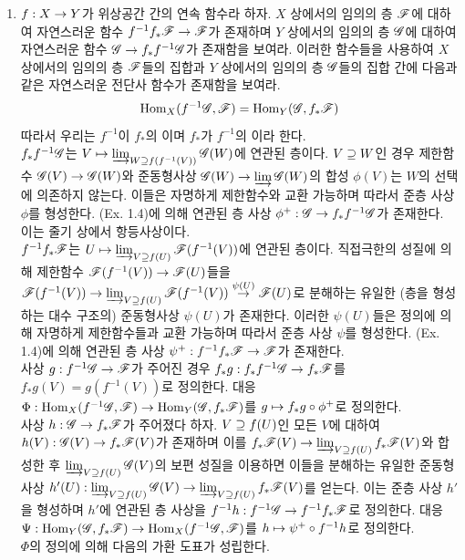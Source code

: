 \begin{enumerate}[label=\tb{1.\arabic*.},itemindent=0mm,itemsep=4mm]
	\item {} $f:X\rightarrow Y$가 위상공간 간의 연속 함수라 하자.
	$X$ 상에서의 임의의 층 $\mathscr{F}$에 대하여 자연스러운 함수 $f^{-1}f_*\mathscr{F}\rightarrow\mathscr{F}$가 존재하며
	$Y$ 상에서의 임의의 층 $\mathscr{G}$에 대하여 자연스러운 함수 $\mathscr{G}\rightarrow f_*f^{-1}\mathscr{G}$가 존재함을 보여라.
	이러한 함수들을 사용하여 $X$ 상에서의 임의의 층 $\mathscr{F}$들의 집합과 $Y$ 상에서의 임의의 층 $\mathscr{G}$들의 집합 간에
	다음과 같은 자연스러운 전단사 함수가 존재함을 보여라.
	$$\operatorname{Hom}_X(f^{-1}\mathscr{G},\mathscr{F})=\operatorname{Hom}_Y(\mathscr{G},f_*\mathscr{F})$$
	따라서 우리는 $f^{-1}$이 $f_*$의 이며 $f_*$가 $f^{-1}$의 이라 한다.\\
	\sol $f_*f^{-1}\mathscr{G}$는 $V\mapsto\varinjlim_{W\supseteq f(f^{-1}(V))}\mathscr{G}(W)$에 연관된 층이다.
	$V\supseteq W$인 경우 제한함수 $\mathscr{G}(V)\rightarrow\mathscr{G}(W)$와 준동형사상 $\mathscr{G}(W)\rightarrow\varinjlim\mathscr{G}(W)$의 합성 $\phi(V)$는
	$W$의 선택에 의존하지 않는다. 이들은 자명하게 제한함수와 교환 가능하며 따라서 준층 사상 $\phi$를 형성한다.
	(Ex. 1.4)에 의해 연관된 층 사상 $\phi^+:\mathscr{G}\rightarrow f_*f^{-1}\mathscr{G}$가 존재한다. 이는 줄기 상에서 항등사상이다.\\
	$f^{-1}f_*\mathscr{F}$는 $U\mapsto\varinjlim_{V\supseteq f(U)}\mathscr{F}(f^{-1}(V))$에 연관된 층이다.
	직접극한의 성질에 의해 제한함수 $\mathscr{F}(f^{-1}(V))\rightarrow\mathscr{F}(U)$들을
	$\mathscr{F}(f^{-1}(V))\rightarrow\varinjlim_{V\supseteq f(U)}\mathscr{F}(f^{-1}(V))\stackrel{\psi(U)}{\rightarrow}\mathscr{F}(U)$로 분해하는 유일한
	(층을 형성하는 대수 구조의) 준동형사상 $\psi(U)$가 존재한다.
	이러한 $\psi(U)$들은 정의에 의해 자명하게 제한함수들과 교환 가능하며 따라서 준층 사상 $\psi$를 형성한다.
	(Ex. 1.4)에 의해 연관된 층 사상 $\psi^+:f^{-1}f_*\mathscr{F}\rightarrow\mathscr{F}$가 존재한다.\\
	사상 $g:f^{-1}\mathscr{G}\rightarrow\mathscr{F}$가 주어진 경우 $f_*g:f_*f^{-1}\mathscr{G}\rightarrow f_*\mathscr{F}$를 $f_*g(V)=g(f^{-1}(V))$로 정의한다.
	대응 $\Phi:\operatorname{Hom}_X(f^{-1}\mathscr{G},\mathscr{F})\rightarrow\operatorname{Hom}_Y(\mathscr{G},f_*\mathscr{F})$를 $g\mapsto f_*g\circ\phi^+$로 정의한다.\\
	사상 $h:\mathscr{G}\rightarrow f_*\mathscr{F}$가 주어졌다 하자. $V\supseteq f(U)$인 모든 $V$에 대하여 $h(V):\mathscr{G}(V)\rightarrow f_*\mathscr{F}(V)$가 존재하며
	이를 $f_*\mathscr{F}(V)\rightarrow\varinjlim_{V\supseteq f(U)}f_*\mathscr{F}(V)$와 합성한 후 $\varinjlim_{V\supseteq f(U)}\mathscr{G}(V)$의 보편 성질을 이용하면
	이들을 분해하는 유일한 준동형사상 $h'(U):\varinjlim_{V\supseteq f(U)}\mathscr{G}(V)\rightarrow\varinjlim_{V\supseteq f(U)}f_*\mathscr{F}(V)$를 얻는다.
	이는 준층 사상 $h'$을 형성하며 $h'$에 연관된 층 사상을 $f^{-1}h:f^{-1}\mathscr{G}\rightarrow f^{-1}f_*\mathscr{F}$로 정의한다.
	대응 $\Psi:\operatorname{Hom}_Y(\mathscr{G},f_*\mathscr{F})\rightarrow\operatorname{Hom}_X(f^{-1}\mathscr{G},\mathscr{F})$를 $h\mapsto\psi^+\circ f^{-1}h$로 정의한다.\\
	$\Phi$의 정의에 의해 다음의 가환 도표가 성립한다.

\end{enumerate}
